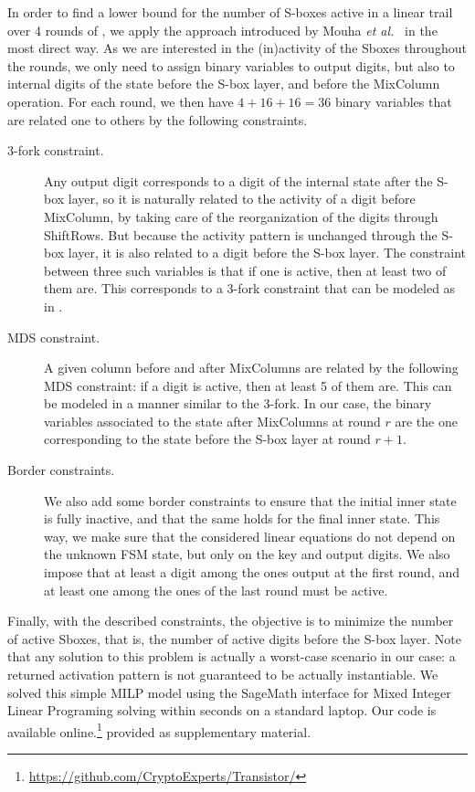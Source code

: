 In order to find a lower bound for the number of S-boxes active in a linear trail over 4 rounds of \coolName, we apply the approach introduced by Mouha \emph{et al.\@}~\cite{add:MWGP11} in the most direct way. As we are interested in the (in)activity of the Sboxes throughout the rounds, we only need to assign binary variables to output digits, but also to internal digits of the state before the S-box layer, and before the MixColumn operation. For each round, we then have $4 + 16 + 16 = 36$ binary variables that are related one to others by the following constraints.
\begin{description}
\item[3-fork constraint.] Any output digit corresponds to a digit of the internal state after the S-box layer, so it is naturally related to the activity of a digit before MixColumn, by taking care of the reorganization of the digits through ShiftRows. But because the activity pattern is unchanged through the S-box layer, it is also related to a digit before the S-box layer. The constraint between three such variables is that if one is active, then at least two of them are. This corresponds to a 3-fork constraint that can be modeled as in \cite[Sec~ 2.2]{add:MWGP11}.
\item[MDS constraint.] A given column before and after MixColumns are related by the following MDS constraint: if a digit is active, then at least 5 of them are. This can be modeled in a manner similar to the 3-fork. In our case, the binary variables associated to the state after MixColumns at round $r$ are the one corresponding to the state before the S-box layer at round $r+1$.
\item[Border constraints.] We also add some border constraints to ensure that the initial inner state is fully inactive, and that the same holds for the final inner state. This way, we make sure that the considered linear equations do not depend on the unknown FSM state, but only on the key and output digits. We also impose that at least a digit among the ones output at the first round, and at least one among the ones of the last round must be active.
\end{description}
Finally, with the described constraints, the objective is to minimize the number of active Sboxes, that is, the number of active digits before the S-box layer. Note that any solution to this problem is actually a worst-case scenario in our case: a returned activation pattern is not guaranteed to be actually instantiable. We solved this simple MILP model using the SageMath interface for Mixed Integer Linear Programing solving within seconds on a standard laptop. Our code is 
\ifeprint
  available online.\footnote{\url{https://github.com/CryptoExperts/Transistor/}}
\else
  provided as supplementary material.
\fi

